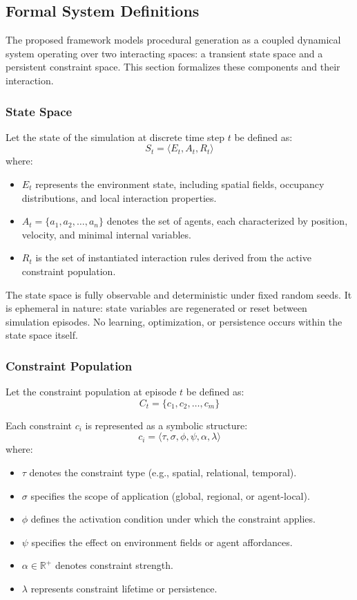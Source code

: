 \subsection{Formal System Definitions}

The proposed framework models procedural generation as a coupled dynamical system operating over two interacting spaces: a transient state space and a persistent constraint space. This section formalizes these components and their interaction.

\subsubsection{State Space}

Let the state of the simulation at discrete time step $t$ be defined as:
\[
S_t = \langle E_t, A_t, R_t \rangle
\]
where:
\begin{itemize}
    \item $E_t$ represents the environment state, including spatial fields, occupancy distributions, and local interaction properties.
    \item $A_t = \{a_1, a_2, \dots, a_n\}$ denotes the set of agents, each characterized by position, velocity, and minimal internal variables.
    \item $R_t$ is the set of instantiated interaction rules derived from the active constraint population.
\end{itemize}

The state space is fully observable and deterministic under fixed random seeds. It is ephemeral in nature: state variables are regenerated or reset between simulation episodes. No learning, optimization, or persistence occurs within the state space itself.

\subsubsection{Constraint Population}

Let the constraint population at episode $t$ be defined as:
\[
C_t = \{c_1, c_2, \dots, c_m\}
\]

Each constraint $c_i$ is represented as a symbolic structure:
\[
c_i = \langle \tau, \sigma, \phi, \psi, \alpha, \lambda \rangle
\]
where:
\begin{itemize}
    \item $\tau$ denotes the constraint type (e.g., spatial, relational, temporal).
    \item $\sigma$ specifies the scope of application (global, regional, or agent-local).
    \item $\phi$ defines the activation condition under which the constraint applies.
    \item $\psi$ specifies the effect on environment fields or agent affordances.
    \item $\alpha \in \mathbb{R}^+$ denotes constraint strength.
    \item $\lambda$ represents constraint lifetime or persistence.
\end{itemize}

